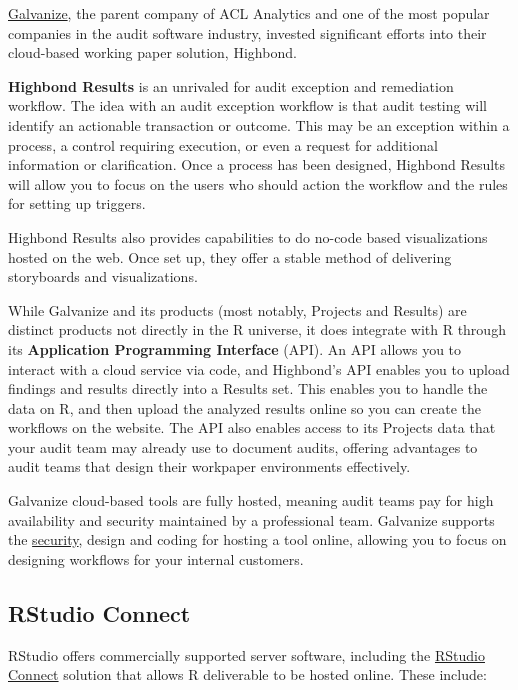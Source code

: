\documentclass[
]{book}
\begin{document}
\href{https://www.wegalvanize.com}{Galvanize}, the parent company of ACL Analytics and one of the most popular companies in the audit software industry, invested significant efforts into their cloud-based working paper solution, Highbond.

\textbf{Highbond Results} is an unrivaled for audit exception and remediation workflow. The idea with an audit exception workflow is that audit testing will identify an actionable transaction or outcome. This may be an exception within a process, a control requiring execution, or even a request for additional information or clarification. Once a process has been designed, Highbond Results will allow you to focus on the users who should action the workflow and the rules for setting up triggers.

Highbond Results also provides capabilities to do no-code based visualizations hosted on the web. Once set up, they offer a stable method of delivering storyboards and visualizations.

While Galvanize and its products (most notably, Projects and Results) are distinct products not directly in the R universe, it does integrate with R through its \textbf{Application Programming Interface} (API). An API allows you to interact with a cloud service via code, and Highbond's API enables you to upload findings and results directly into a Results set. This enables you to handle the data on R, and then upload the analyzed results online so you can create the workflows on the website. The API also enables access to its Projects data that your audit team may already use to document audits, offering advantages to audit teams that design their workpaper environments effectively.

Galvanize cloud-based tools are fully hosted, meaning audit teams pay for high availability and security maintained by a professional team. Galvanize supports the \href{https://www.wegalvanize.com/trust/}{security}, design and coding for hosting a tool online, allowing you to focus on designing workflows for your internal customers.

\hypertarget{rstudio-connect}{%
\subsection{RStudio Connect}\label{rstudio-connect}}

RStudio offers commercially supported server software, including the \href{https://rstudio.com/products/connect/}{RStudio Connect} solution that allows R deliverable to be hosted online. These include:
\end{document}
